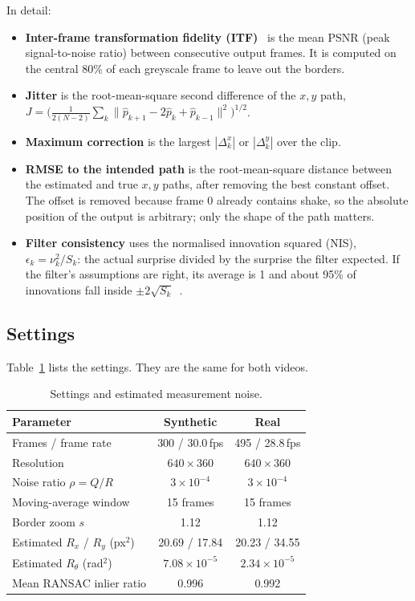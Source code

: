 \documentclass[11pt,a4paper]{article}
\begin{document}
In detail:
\begin{itemize}
  \item \textbf{Inter-frame transformation fidelity (ITF)}~\cite{morimoto1998} is the mean
        PSNR (peak signal-to-noise ratio) between consecutive output frames. It is computed
        on the central 80\% of each greyscale frame to leave out the borders.
  \item \textbf{Jitter} is the root-mean-square second difference of the $x, y$ path,
        $J = \bigl(\frac{1}{2(N-2)} \sum_k \lVert \hat p_{k+1} - 2\hat p_k + \hat p_{k-1}\rVert^2\bigr)^{1/2}$.
  \item \textbf{Maximum correction} is the largest $|\Delta_k^x|$ or $|\Delta_k^y|$ over the
        clip.
  \item \textbf{RMSE to the intended path} is the root-mean-square distance between the
        estimated and true $x, y$ paths, after removing the best constant offset. The offset
        is removed because frame 0 already contains shake, so the absolute position of the
        output is arbitrary; only the shape of the path matters.
  \item \textbf{Filter consistency} uses the normalised innovation squared (NIS),
        $\epsilon_k = \nu_k^2 / S_k$: the actual surprise divided by the surprise the filter
        expected. If the filter's assumptions are right, its average is 1 and about 95\% of
        innovations fall inside $\pm 2\sqrt{S_k}$~\cite{barshalom2001}.
\end{itemize}

\subsection{Settings}
Table~\ref{tab:settings} lists the settings. They are the same for both videos.

\begin{table}[htbp]
  \centering
  \caption{Settings and estimated measurement noise.}
  \label{tab:settings}
  \begin{tabular}{lcc}
    \toprule
    Parameter & Synthetic & Real \\
    \midrule
    Frames / frame rate & 300 / 30.0\,fps & 495 / 28.8\,fps \\
    Resolution & $640\times360$ & $640\times360$ \\
    Noise ratio $\rho = Q/R$ & $3\times10^{-4}$ & $3\times10^{-4}$ \\
    Moving-average window & 15 frames & 15 frames \\
    Border zoom $s$ & 1.12 & 1.12 \\
    Estimated $R_x$ / $R_y$ (px$^2$) & 20.69 / 17.84 & 20.23 / 34.55 \\
    Estimated $R_\theta$ (rad$^2$) & $7.08\times10^{-5}$ & $2.34\times10^{-5}$ \\
    Mean RANSAC inlier ratio & 0.996 & 0.992 \\
    \bottomrule
  \end{tabular}
\end{table}
\end{document}
